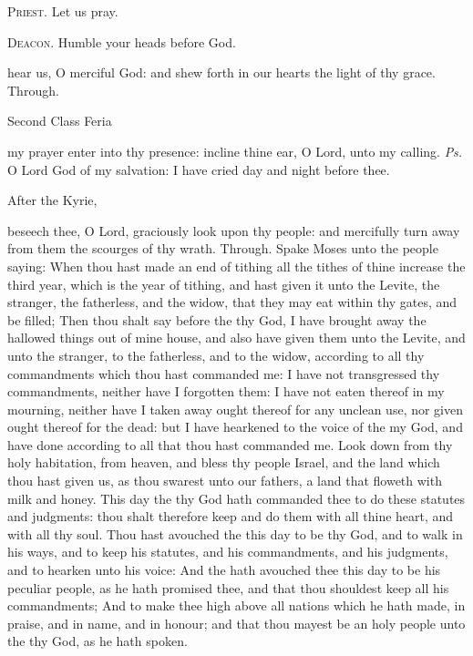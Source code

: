 \textsc{Priest.} Let us pray.\par
\textsc{Deacon.} Humble your heads before God.\par
{} hear us, O merciful God: and shew forth in our hearts the light of thy grace. Through.

\begin{inhead}
{Second Class Feria}
\end{inhead}
\par\noindent
{}
\introit
{} my prayer enter into thy presence: incline thine ear, O Lord, unto my calling. \textit{Ps.} O Lord God of my salvation: I have cried day and night before thee.
\begin{rubric}
    After the Kyrie,
\end{rubric}
\collect
{} beseech thee, O Lord, graciously look upon thy people: and mercifully turn away from them the scourges of thy wrath. Through.
 Spake Moses unto the people saying: When thou hast made an end of tithing all the tithes of thine increase the third year, which is the year of tithing, and hast given it unto the Levite, the stranger, the fatherless, and the widow, that they may eat within thy gates, and be filled; Then thou shalt say before the  thy God, I have brought away the hallowed things out of mine house, and also have given them unto the Levite, and unto the stranger, to the fatherless, and to the widow, according to all thy commandments which thou hast commanded me: I have not transgressed thy commandments, neither have I forgotten them: I have not eaten thereof in my mourning, neither have I taken away ought thereof for any unclean use, nor given ought thereof for the dead: but I have hearkened to the voice of the  my God, and have done according to all that thou hast commanded me. Look down from thy holy habitation, from heaven, and bless thy people Israel, and the land which thou hast given us, as thou swarest unto our fathers, a land that floweth with milk and honey. This day the  thy God hath commanded thee to do these statutes and judgments: thou shalt therefore keep and do them with all thine heart, and with all thy soul. Thou hast avouched the  this day to be thy God, and to walk in his ways, and to keep his statutes, and his commandments, and his judgments, and to hearken unto his voice: And the  hath avouched thee this day to be his peculiar people, as he hath promised thee, and that thou shouldest keep all his commandments; And to make thee high above all nations which he hath made, in praise, and in name, and in honour; and that thou mayest be an holy people unto the  thy God, as he hath spoken.
